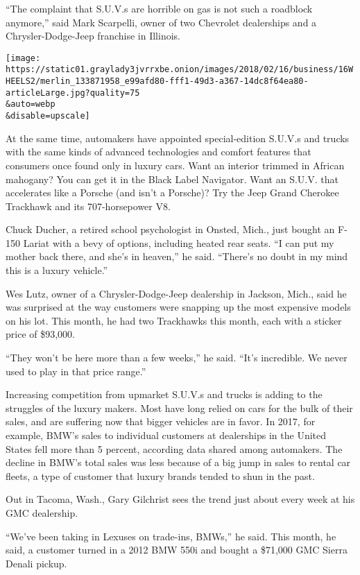 ``The complaint that S.U.V.s are horrible on gas is not such a roadblock
anymore,'' said Mark Scarpelli, owner of two Chevrolet dealerships and a
Chrysler-Dodge-Jeep franchise in Illinois.

\texttt{[image: https://static01.graylady3jvrrxbe.onion/images/2018/02/16/business/16WHEELS2/merlin\_133871958\_e99afd80-fff1-49d3-a367-14dc8f64ea80-articleLarge.jpg?quality=75\\\&auto=webp\\\&disable=upscale]}

At the same time, automakers have appointed special-edition S.U.V.s and
trucks with the same kinds of advanced technologies and comfort features
that consumers once found only in luxury cars. Want an interior trimmed
in African mahogany? You can get it in the Black Label Navigator. Want
an S.U.V. that accelerates like a Porsche (and isn't a Porsche)? Try the
Jeep Grand Cherokee Trackhawk and its 707-horsepower V8.

Chuck Ducher, a retired school psychologist in Onsted, Mich., just
bought an F-150 Lariat with a bevy of options, including heated rear
seats. ``I can put my mother back there, and she's in heaven,'' he said.
``There's no doubt in my mind this is a luxury vehicle.''

Wes Lutz, owner of a Chrysler-Dodge-Jeep dealership in Jackson, Mich.,
said he was surprised at the way customers were snapping up the most
expensive models on his lot. This month, he had two Trackhawks this
month, each with a sticker price of \$93,000.

``They won't be here more than a few weeks,'' he said. ``It's
incredible. We never used to play in that price range.''

Increasing competition from upmarket S.U.V.s and trucks is adding to the
struggles of the luxury makers. Most have long relied on cars for the
bulk of their sales, and are suffering now that bigger vehicles are in
favor. In 2017, for example, BMW's sales to individual customers at
dealerships in the United States fell more than 5 percent, according
data shared among automakers. The decline in BMW's total sales was less
because of a big jump in sales to rental car fleets, a type of customer
that luxury brands tended to shun in the past.

Out in Tacoma, Wash., Gary Gilchrist sees the trend just about every
week at his GMC dealership.

``We've been taking in Lexuses on trade-ins, BMWs,'' he said. This
month, he said, a customer turned in a 2012 BMW 550i and bought a
\$71,000 GMC Sierra Denali pickup.

